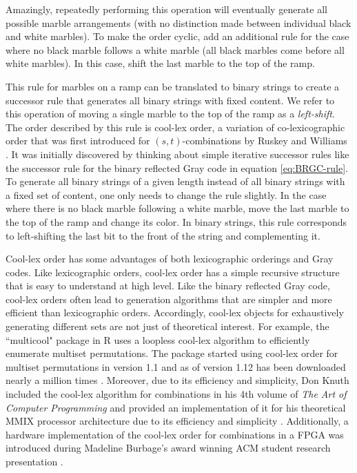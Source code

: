 Amazingly, repeatedly performing this operation will eventually generate all possible marble arrangements (with no distinction made between individual black and white marbles). To make the order cyclic, add an additional rule for the case where no black marble follows a white marble (all black marbles come before all white marbles).  In this case, shift the last marble to the top of the ramp.

This rule for marbles on a ramp can be translated to binary strings to create a successor rule that generates all binary strings with fixed content.  We refer to this operation of moving a single marble to the top of the ramp as a \emph{left-shift}.
The order described by this rule is 
cool-lex order, a variation of co-lexicographic order that was first introduced for $(s,t)$-combinations by Ruskey and Williams \cite{ruskey2005generating} \cite{ruskey2008generating}.  It was initially discovered by thinking about simple iterative successor rules like the successor rule for the binary reflected Gray code in equation \ref{eq:BRGC-rule}. To generate all binary strings of a given length instead of all binary strings with a fixed set of content, one only needs to change the rule slightly.  In the case where there is no black marble following a white marble, move the last marble to the top of the ramp and change its color.  In binary strings, this rule corresponds to left-shifting the last bit to the front of the string and complementing it.

Cool-lex order has some advantages of both lexicographic orderings and Gray codes.  Like lexicographic orders, cool-lex order has a simple recursive structure that is easy to understand at  high level.  
Like the binary reflected Gray code, cool-lex orders often lead to generation algorithms that are simpler and more efficient than lexicographic orders.  Accordingly, cool-lex objects for exhaustively generating different sets are not just of theoretical interest.
For example, the ``multicool" package in R uses a loopless cool-lex algorithm to efficiently enumerate multiset permutations.   The package started using cool-lex order for multiset permutations in version 1.1 and as of version 1.12 has been downloaded nearly a million times \cite{multicool_2021}.  Moreover, due to its efficiency and simplicity, Don Knuth included the cool-lex algorithm for combinations in his 4th volume of \emph{The Art of Computer Programming} and provided an implementation of it for his theoretical MMIX processor architecture due to its efficiency and simplicity \cite{knuth2015art}.  Additionally, a hardware implementation of the cool-lex order for combinations in a FPGA was introduced during Madeline Burbage's award winning ACM student research presentation \cite{burbage2020cool}.

